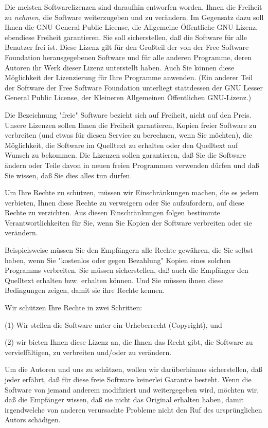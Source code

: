 {\small

Die meisten Softwarelizenzen sind daraufhin entworfen worden, Ihnen die Freiheit zu \textit{nehmen}, die Software weiterzugeben und zu verändern. Im Gegensatz dazu soll Ihnen die GNU General Public License, die Allgemeine Öffentliche GNU-Lizenz, ebendiese Freiheit garantieren. Sie soll sicherstellen, daß die Software für alle Benutzer frei ist. Diese Lizenz gilt für den Großteil der von der Free Software Foundation herausgegebenen Software und für alle anderen Programme, deren Autoren ihr Werk dieser Lizenz unterstellt haben. Auch Sie können diese Möglichkeit der Lizenzierung für Ihre Programme anwenden. (Ein anderer Teil der Software der Free Software Foundation unterliegt stattdessen der GNU Lesser General Public License, der Kleineren Allgemeinen Öffentlichen GNU-Lizenz.)

Die Bezeichnung "freie" Software bezieht sich auf Freiheit, nicht auf den Preis. Unsere Lizenzen sollen Ihnen die Freiheit garantieren, Kopien freier Software zu verbreiten (und etwas für diesen Service zu berechnen, wenn Sie möchten), die Möglichkeit, die Software im Quelltext zu erhalten oder den Quelltext auf Wunsch zu bekommen. Die Lizenzen sollen garantieren, daß Sie die Software ändern oder Teile davon in neuen freien Programmen verwenden dürfen und daß Sie wissen, daß Sie dies alles tun dürfen.

Um Ihre Rechte zu schützen, müssen wir Einschränkungen machen, die es jedem verbieten, Ihnen diese Rechte zu verweigern oder Sie aufzufordern, auf diese Rechte zu verzichten. Aus diesen Einschränkungen folgen bestimmte Verantwortlichkeiten für Sie, wenn Sie Kopien der Software verbreiten oder sie verändern.

Beispielsweise müssen Sie den Empfängern alle Rechte gewähren, die Sie selbst haben, wenn Sie "kostenlos oder gegen Bezahlung" Kopien eines solchen Programms verbreiten. Sie müssen sicherstellen, daß auch die Empfänger den Quelltext erhalten bzw. erhalten können. Und Sie müssen ihnen diese Bedingungen zeigen, damit sie ihre Rechte kennen.

Wir schützen Ihre Rechte in zwei Schritten: 

(1) Wir stellen die Software unter ein Urheberrecht (Copyright), und 

(2) wir bieten Ihnen diese Lizenz an, die Ihnen das Recht gibt, die Software zu vervielfältigen, zu verbreiten und/oder zu verändern.

Um die Autoren und uns zu schützen, wollen wir darüberhinaus sicherstellen, daß jeder erfährt, daß für diese freie Software keinerlei Garantie besteht. Wenn die Software von jemand anderem modifiziert und weitergegeben wird, möchten wir, daß die Empfänger wissen, daß sie nicht das Original erhalten haben, damit irgendwelche von anderen verursachte Probleme nicht den Ruf des ursprünglichen Autors schädigen.

}
